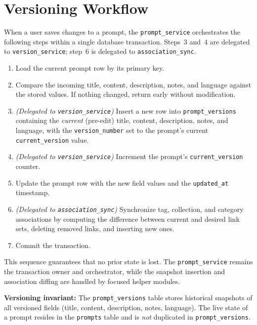 \documentclass[a4paper, 11pt, oneside]{report}
\begin{document}
\section{Versioning Workflow}
\label{sec:version-workflow}

When a user saves changes to a prompt, the \texttt{prompt\_service}
orchestrates the following steps within a single database transaction.
Steps~3 and~4 are delegated to \texttt{version\_service}; step~6 is
delegated to \texttt{association\_sync}.

\begin{enumerate}
  \item Load the current prompt row by its primary key.
  \item Compare the incoming title, content, description,
        notes, and language against the stored values.  If nothing changed,
        return early without modification.
  \item \textit{(Delegated to \texttt{version\_service})}
        Insert a new row into \texttt{prompt\_versions} containing
        the \emph{current} (pre-edit) title, content,
        description, notes, and language, with the
        \texttt{version\_number} set to the prompt's current
        \texttt{current\_version} value.
  \item \textit{(Delegated to \texttt{version\_service})} Increment the
        prompt's \texttt{current\_version} counter.
  \item Update the prompt row with the new field values and the
        \texttt{updated\_at} timestamp.
  \item \textit{(Delegated to \texttt{association\_sync})} Synchronize
        tag, collection, and category associations by computing the
        difference between current and desired link sets, deleting removed
        links, and inserting new ones.
  \item Commit the transaction.
\end{enumerate}

This sequence guarantees that no prior state is lost.  The
\texttt{prompt\_service} remains the transaction owner and orchestrator,
while the snapshot insertion and association diffing are handled by
focused helper modules.

\textbf{Versioning invariant:} The \texttt{prompt\_versions} table stores
historical snapshots of all versioned fields (title,
content, description, notes, language).  The live state of a prompt
resides in the \texttt{prompts} table and is \emph{not} duplicated in
\texttt{prompt\_versions}.
\end{document}
